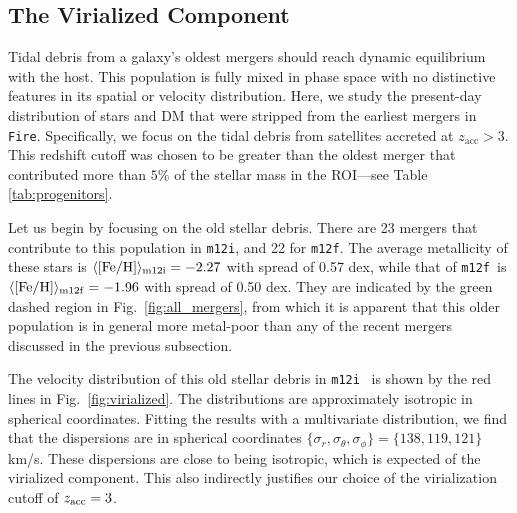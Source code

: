 \documentclass[twocolumn,preprintnumbers]{aastex6}
\DeclareRobustCommand{\Fig}[1]{Fig.~\ref{#1}}
\newcommand{\zacc}{z_\mathrm{acc}}
\newcommand{\mi}{\texttt{m12i}}
\newcommand{\mf}{\texttt{m12f}}
\begin{document}


\subsection{The Virialized Component}
\label{sec:virialized}

Tidal debris from a galaxy's oldest mergers should reach dynamic equilibrium with the host.  This population is fully mixed in phase space with no distinctive features in its spatial or velocity distribution.  %
Here, we study the present-day distribution of stars and DM that were stripped from the earliest mergers in \texttt{Fire}.  Specifically, we focus on the tidal debris from satellites accreted at $\zacc >3$.  This redshift cutoff was chosen to be greater than the oldest merger that contributed more than $5\%$ of the stellar mass in the ROI---see Table \ref{tab:progenitors}.

Let us begin by focusing on the old stellar debris.  There are 23 mergers that contribute to this population in \mi, and 22 for \mf.  The average metallicity of these stars is  $\langle \rm{[Fe/H]} \rangle_{\rm{m12i}}  = -2.27$ with spread of 0.57 dex, while that of \mf~is $\langle \rm{[Fe/H]} \rangle_{\rm{m12f}}  = -1.96$ with spread of 0.50 dex. They are indicated by the green dashed region in \Fig{fig:all_mergers}, from which it is apparent that this older population is in general more metal-poor than any of the recent mergers discussed in the previous subsection.

The velocity distribution of this old stellar debris in \mi~ is shown by the red lines in \Fig{fig:virialized}.  The distributions are approximately isotropic in spherical coordinates.  Fitting the results with a multivariate distribution, we find that the dispersions are in spherical coordinates $\{ \sigma_r, \sigma_{\theta}, \sigma_{\phi} \} =  \{138, 119, 121 \}$ km/s. These dispersions are close to being isotropic, which is expected of the virialized component. This also indirectly justifies our choice of the virialization cutoff of $z_{\rm{acc}}=3$.
\end{document}
